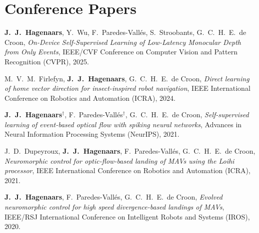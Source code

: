 \section*{Conference Papers}
\vspace{5pt}
\begin{etaremune}{\small
	\item[\faFileTextO~~\hspace{4pt}5.] \textbf{J.\ J.\ Hagenaars}, Y.\ Wu, F.\ Paredes-Vall\'es, S.\ Stroobants, G.\ C.\ H.\ E.\ de Croon, \emph{On-Device Self-Supervised Learning of Low-Latency Monocular Depth from Only Events}, IEEE/CVF Conference on Computer Vision and Pattern Recognition (CVPR), 2025.
	\item[\faFileTextO~~\hspace{4pt}4.] M.\ V.\ M.\ Firlefyn, \textbf{J.\ J.\ Hagenaars}, G.\ C.\ H.\ E.\ de Croon, \emph{Direct learning of home vector direction for insect-inspired robot navigation}, IEEE International Conference on Robotics and Automation (ICRA), 2024.
	\item[\faFileTextO~~\hspace{4pt}3.] \textbf{J.\ J.\ Hagenaars}$^\dagger$, F.\ Paredes-Vall\'es$^\dagger$, G.\ C.\ H.\ E.\ de Croon, \emph{Self-supervised learning of event-based optical flow with spiking neural networks}, Advances in Neural Information Processing Systems (NeurIPS), 2021.
	\item[2.] J.\ D.\ Dupeyroux, \textbf{J.\ J.\ Hagenaars}, F.\ Paredes-Vall\'es, G.\ C.\ H.\ E.\ de Croon, \emph{Neuromorphic control for optic-flow-based landing of MAVs using the Loihi processor}, IEEE International Conference on Robotics and Automation (ICRA), 2021.
	\item[1.] \textbf{J.\ J.\ Hagenaars}, F.\ Paredes-Vall\'es, G.\ C.\ H.\ E.\ de Croon, \emph{Evolved neuromorphic control for high speed divergence-based landings of MAVs}, IEEE/RSJ International Conference on Intelligent Robots and Systems (IROS), 2020.
}\end{etaremune}
